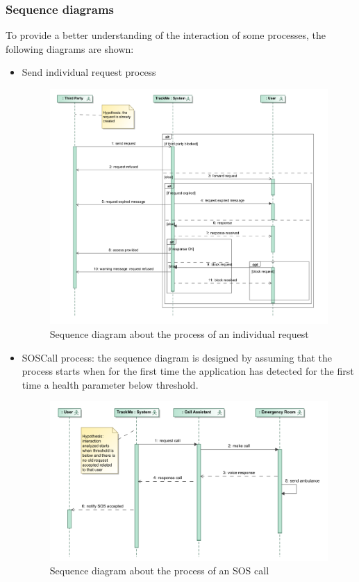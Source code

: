\subsubsection{Sequence diagrams}
To provide a better understanding of the interaction of some processes, the following diagrams are shown:
\begin{itemize}
\item Send individual request process
\begin{figure}[H]
\includegraphics[width=\linewidth]{Images/requestsequence}
\caption{Sequence diagram about the process of an individual request }
\label{fig:sequencediagram1}
\end{figure}

\item SOSCall process: the sequence diagram is designed by assuming that the process starts when for the first time the application has detected for the first time a health parameter below threshold.
\begin{figure}[H]
\includegraphics[width=\linewidth]{Images/callsequence}
\caption{Sequence diagram about the process of an SOS call }
\label{fig:sequencediagram2}
\end{figure}

\end{itemize}